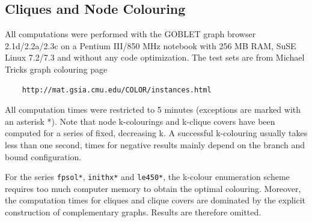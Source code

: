 \documentclass[a4paper,11pt,twoside]{book}
\begin{document}
\begin{multicols}{2}
\section{Cliques and Node Colouring}
All computations were performed with the GOBLET graph browser 2.1d/2.2a/2.3c on a Pentium
III/850 MHz notebook with 256 MB RAM, SuSE Linux 7.2/7.3 and without any code
optimization. The test sets are from Michael Tricks graph colouring page
\begin{verbatim}
    http://mat.gsia.cmu.edu/COLOR/instances.html
\end{verbatim}
All computation times were restricted to 5 minutes (exceptions are marked with an
asterisk *). Note that node k-colourings and k-clique covers have been computed for
a series of fixed, decreasing k. A successful k-colouring usually takes less than
one second, times for negative results mainly depend on the branch and bound
configuration.

For the series \verb/fpsol*/, \verb/inithx*/ and \verb/le450*/, the k-colour
enumeration scheme requires too much computer memory to obtain the optimal 
colouring. Moreover, the computation times for cliques and clique covers are
dominated by the explicit construction of complementary graphs. Results are
therefore omitted.


\end{multicols}
\end{document}
